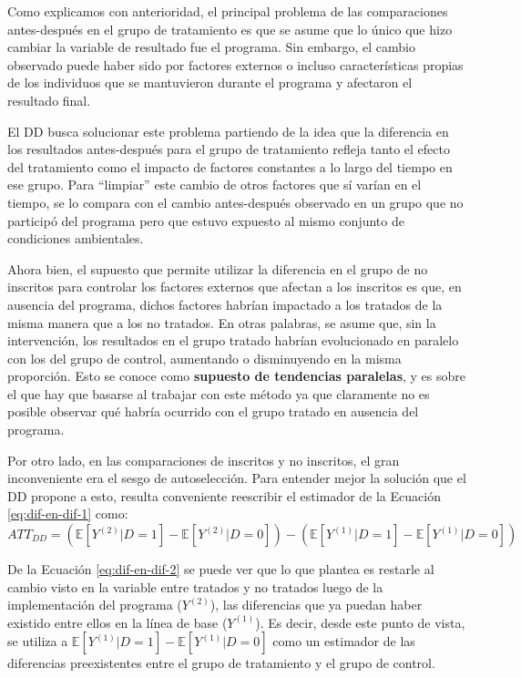 \documentclass[../../main.tex]{subfiles}
\begin{document}
Como explicamos con anterioridad, el principal problema de las comparaciones antes-después
en el grupo de tratamiento es que se asume que lo único que hizo cambiar la variable de
resultado fue el programa. Sin embargo, el cambio observado puede haber sido por factores
externos o incluso características propias de los individuos que se mantuvieron durante el
programa y afectaron el resultado final.

El DD busca solucionar este problema partiendo de la idea que la diferencia en los
resultados antes-después para el grupo de tratamiento refleja tanto el efecto del
tratamiento como el impacto de factores constantes a lo largo del tiempo en ese
grupo. Para ``limpiar'' este cambio de otros factores que sí varían en el tiempo, se lo
compara con el cambio antes-después observado en un grupo que no participó del programa
pero que estuvo expuesto al mismo conjunto de condiciones ambientales.

Ahora bien, el supuesto que permite utilizar la diferencia en el grupo de no inscritos
para controlar los factores externos que afectan a los inscritos es que, en ausencia del
programa, dichos factores habrían impactado a los tratados de la misma manera que a los no
tratados. En otras palabras, se asume que, sin la intervención, los resultados en el grupo
tratado habrían evolucionado en paralelo con los del grupo de control, aumentando o
disminuyendo en la misma proporción. Esto se conoce como \textbf{supuesto de tendencias
paralelas}, y es sobre el que hay que basarse al trabajar con este método ya que
claramente no es posible observar qué habría ocurrido con el grupo tratado en ausencia del
programa.

Por otro lado, en las comparaciones de inscritos y no inscritos, el gran inconveniente era
el sesgo de autoselección. Para entender mejor la solución que el DD propone a esto,
resulta conveniente reescribir el estimador de la Ecuación \ref{eq:dif-en-dif-1} como:
\begin{equation}
    ATT_{DD} =
        \left(
            \mathbb{E}\left[Y^{(2)}|D=1\right] - \mathbb{E}\left[Y^{(2)}|D=0\right]
        \right) -
        \left(
            \mathbb{E}\left[Y^{(1)}|D=1\right] - \mathbb{E}\left[Y^{(1)}|D=0\right]
        \right)
        \label{eq:dif-en-dif-2}
\end{equation}

De la Ecuación \ref{eq:dif-en-dif-2} se puede ver que lo que plantea es restarle al cambio
visto en la variable entre tratados y no tratados luego de la implementación del programa
(\(Y^{(2)}\)), las diferencias que ya puedan haber existido entre ellos en la línea de base
(\(Y^{(1)}\)). Es decir, desde este punto de vista, se utiliza a
\(\mathbb{E}\left[Y^{(1)}|D=1\right] - \mathbb{E}\left[Y^{(1)}|D=0\right]\) como un
estimador de las diferencias preexistentes entre el grupo de tratamiento y el grupo de
control.
\end{document}
